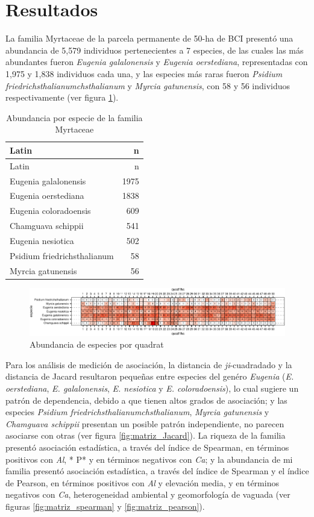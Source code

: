 \documentclass[11pt,]{article}
\begin{document}
\section{Resultados}\label{resultados}

La familia Myrtaceae de la parcela permanente de 50-ha de BCI presentó
una abundancia de 5,579 individuos pertenecientes a 7 especies, de las
cuales las más abundantes fueron \emph{Eugenia galalonensis} y
\emph{Eugenia oerstediana}, representadas con 1,975 y 1,838 individuos
cada una, y las especies más raras fueron \emph{Psidium
friedrichsthalianumchsthalianum} y \emph{Myrcia gatunensis}, con 58 y 56
individuos respectivamente (ver figura \ref{tab:abun_sp}).

\begin{longtable}[]{@{}lr@{}}
\caption{\label{tab:abun_sp}Abundancia por especie de la familia
Myrtaceae}\tabularnewline
\toprule
Latin & n\tabularnewline
\midrule
\endfirsthead
\toprule
Latin & n\tabularnewline
\midrule
\endhead
Eugenia galalonensis & 1975\tabularnewline
Eugenia oerstediana & 1838\tabularnewline
Eugenia coloradoensis & 609\tabularnewline
Chamguava schippii & 541\tabularnewline
Eugenia nesiotica & 502\tabularnewline
Psidium friedrichsthalianum & 58\tabularnewline
Myrcia gatunensis & 56\tabularnewline
\bottomrule
\end{longtable}

\begin{figure}
\centering
\includegraphics{manuscrito_files/figure-latex/unnamed-chunk-3-1.pdf}
\caption{\label{fig:abun_sp_q}Abundancia de especies por quadrat}
\end{figure}

Para los análisis de medición de asociación, la distancia de
\emph{ji}-cuadradado y la distancia de Jacard resultaron pequeñas entre
especies del genéro \emph{Eugenia} (\emph{E. oerstediana}, \emph{E.
galalonensis}, \emph{E. nesiotica} y \emph{E. coloradoensis}), lo cual
sugiere un patrón de dependencia, debido a que tienen altos grados de
asociación; y las especies \emph{Psidium
friedrichsthalianumchsthalianum}, \emph{Myrcia gatunensis} y
\emph{Chamguava schippii} presentan un posible patrón independiente, no
parecen asociarse con otras (ver figura \ref{fig:matriz_Jacard}). La
riqueza de la familia presentó asociación estadística, a través del
índice de Spearman, en términos positivos con \emph{Al}, * P* y en
términos negativos con \emph{Ca}; y la abundancia de mi familia presentó
asociación estadística, a través del índice de Spearman y el índice de
Pearson, en términos positivos con \emph{Al} y elevación media, y en
términos negativos con \emph{Ca}, heterogeneidad ambiental y
geomorfología de vaguada (ver figuras \ref{fig:matriz_spearman} y
\ref{fig:matriz_pearson}).
\end{document}
